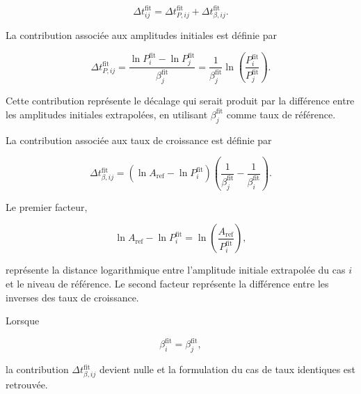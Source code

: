 \documentclass[
    11pt,
    a4paper
]{article}
\begin{document}
\begin{equation}
    \Delta t_{ij}^{\mathrm{fit}}
    =
    \Delta t_{P,ij}^{\mathrm{fit}}
    +
    \Delta t_{\beta,ij}^{\mathrm{fit}}.
    \label{eq:somme-contributions-fit}
\end{equation}

La contribution associée aux amplitudes initiales est définie par

\begin{equation}
    \Delta t_{P,ij}^{\mathrm{fit}}
    =
    \frac{
        \ln P_i^{\mathrm{fit}}
        -
        \ln P_j^{\mathrm{fit}}
    }{
        \beta_j^{\mathrm{fit}}
    }
    =
    \frac{1}{\beta_j^{\mathrm{fit}}}
    \ln\left(
        \frac{P_i^{\mathrm{fit}}}
        {P_j^{\mathrm{fit}}}
    \right).
    \label{eq:contribution-P-fit}
\end{equation}

Cette contribution représente le décalage qui serait produit par la différence
entre les amplitudes initiales extrapolées, en utilisant
\(\beta_j^{\mathrm{fit}}\) comme taux de référence.

La contribution associée aux taux de croissance est définie par

\begin{equation}
    \Delta t_{\beta,ij}^{\mathrm{fit}}
    =
    \left(
        \ln A_{\mathrm{ref}}
        -
        \ln P_i^{\mathrm{fit}}
    \right)
    \left(
        \frac{1}{\beta_j^{\mathrm{fit}}}
        -
        \frac{1}{\beta_i^{\mathrm{fit}}}
    \right).
    \label{eq:contribution-beta-fit}
\end{equation}

Le premier facteur,

\begin{equation}
    \ln A_{\mathrm{ref}}
    -
    \ln P_i^{\mathrm{fit}}
    =
    \ln\left(
        \frac{A_{\mathrm{ref}}}
        {P_i^{\mathrm{fit}}}
    \right),
\end{equation}

représente la distance logarithmique entre l’amplitude initiale extrapolée du
cas \(i\) et le niveau de référence. Le second facteur représente la différence
entre les inverses des taux de croissance.

Lorsque

\begin{equation}
    \beta_i^{\mathrm{fit}}
    =
    \beta_j^{\mathrm{fit}},
\end{equation}

la contribution \(\Delta t_{\beta,ij}^{\mathrm{fit}}\) devient nulle et la
formulation du cas de taux identiques est retrouvée.
\end{document}
